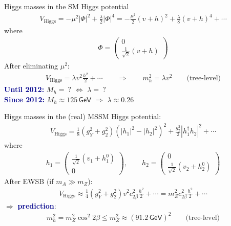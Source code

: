 \documentclass[hyperref={pdfpagelabels=false},ngerman]{beamer}
\newcommand{\eh}[1]{\,\mathsf{#1}}
\renewcommand{\emph}[1]{\textbf{\textcolor{darkblue}{#1}}}
\begin{document}
\begin{frame}[noframenumbering]{Higgs masses in the SM}
  Higgs potential
  \begin{align*}
    V_{\text{Higgs}} = -\mu^2 |\Phi|^2 + \frac{\lambda}{2}|\Phi|^4
    = -\frac{\mu^2}{2} (v+h)^2 + \frac{\lambda}{8} (v+h)^4 + \cdots
  \end{align*}
  where
  \begin{align*}
    \Phi =
    \begin{pmatrix}
      0 \\ \frac{1}{\sqrt{2}} (v + h)
    \end{pmatrix}
  \end{align*}
  After eliminating $\mu^2$:
  \begin{align*}
    V_{\text{Higgs}} = \lambda v^2 \frac{h^2}{2} + \cdots
    \qquad\Rightarrow\qquad
    m_h^2 = \lambda v^2  \qquad \text{(tree-level)}
  \end{align*}
  \emph{Until 2012:} $M_h =\ ?$ $\Leftrightarrow$ $\lambda =\ ?$\\
  \emph{Since 2012:} $M_h \approx 125\eh{GeV}$ $\Rightarrow$ $\lambda \approx 0.26$
\end{frame}


\begin{frame}[noframenumbering]{Higgs masses in the (real) MSSM}
  Higgs potential:
  \begin{align*}
    V_{\text{Higgs}} = \frac{1}{8}(g_Y^2 + g_2^2)(|h_1|^2 - |h_2|^2)^2 + \frac{g_2^2}{2}|h_1^\dagger h_2|^2 + \cdots
  \end{align*}
  where
  \begin{align*}
    h_1 =
    \begin{pmatrix}
      \frac{1}{\sqrt{2}} (v_1 + h_1^0) \\ 0
    \end{pmatrix}, \qquad
    h_2 =
    \begin{pmatrix}
      0 \\ \frac{1}{\sqrt{2}} (v_2 + h_2^0)
    \end{pmatrix}
  \end{align*}
  After EWSB (if $m_A \gg m_Z$):
  \begin{align*}
    V_{\text{Higgs}} \approx \frac{1}{4}(g_Y^2+g_2^2) v^2 c_{2\beta}^2 \frac{h^2}{2} + \cdots
    = m_Z^2 c_{2\beta}^2 \frac{h^2}{2} + \cdots
  \end{align*}
  $\Rightarrow$ \emph{prediction}:
  \begin{align*}
    m_h^2 = m_Z^2 \cos^2{2\beta}
    \leq m_Z^2
    \approx (91.2 \eh{GeV})^2  \qquad \text{(tree-level)}
  \end{align*}
\end{frame}
\end{document}
